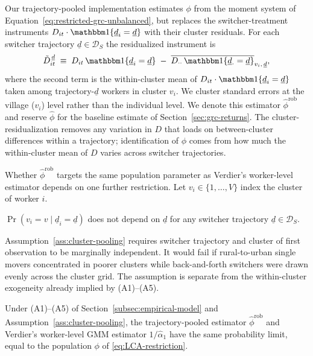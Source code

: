 Our trajectory-pooled implementation estimates $\phi$ from the moment system of Equation~\eqref{eq:restricted-grc-unbalanced}, but replaces the switcher-treatment instruments $D_{it}\cdot\mathbbm 1\{\underline d_i=\underline d\}$ with their cluster residuals.
For each switcher trajectory $\underline d \in \mathcal D_S$ the residualized instrument is
\[
\tilde D_{it}^{\,\underline d} \;\equiv\; D_{it}\,\mathbbm 1\{\underline d_i=\underline d\} \;-\; \overline{D_{\cdot\cdot}\,\mathbbm 1\{\underline d_{\cdot}=\underline d\}}_{v_i,\,\underline d},
\]
where the second term is the within-cluster mean of $D_{it}\cdot\mathbbm 1\{\underline d_i=\underline d\}$ taken among trajectory-$\underline d$ workers in cluster $v_i$.
We cluster standard errors at the village ($v_i$) level rather than the individual level.
We denote this estimator $\hat\phi^{\mathrm{rob}}$ and reserve $\hat\phi$ for the baseline estimate of Section~\ref{sec:grc-returns}.
The cluster-residualization removes any variation in $D$ that loads on between-cluster differences within a trajectory; identification of $\phi$ comes from how much the within-cluster mean of $D$ varies across switcher trajectories.

Whether $\hat\phi^{\mathrm{rob}}$ targets the same population parameter as Verdier's worker-level estimator depends on one further restriction.
Let $v_i \in \{1,\ldots,V\}$ index the cluster of worker $i$.

\begin{assumption}
\label{ass:cluster-pooling}
$\Pr(v_i = v\mid \underline d_i = \underline d)$ does not depend on $\underline d$ for any switcher trajectory $\underline d \in \mathcal D_S$.
\end{assumption}

Assumption~\ref{ass:cluster-pooling} requires switcher trajectory and cluster of first observation to be marginally independent.
It would fail if rural-to-urban single movers concentrated in poorer clusters while back-and-forth switchers were drawn evenly across the cluster grid.
The assumption is separate from the within-cluster exogeneity already implied by (A1)--(A5).

\begin{proposition}
\label{prop:robust-equivalence}
Under (A1)--(A5) of Section~\ref{subsec:empirical-model} and Assumption~\ref{ass:cluster-pooling}, the trajectory-pooled estimator $\hat\phi^{\mathrm{rob}}$ and Verdier's worker-level GMM estimator $1/\hat\alpha_1$ have the same probability limit, equal to the population $\phi$ of \eqref{eq:LCA-restriction}.
\end{proposition}

